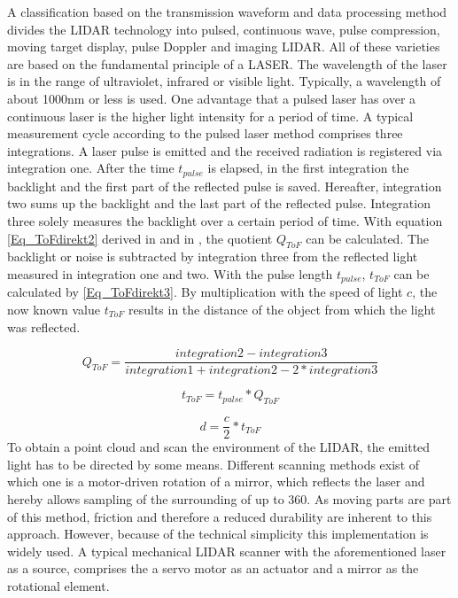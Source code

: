    A classification based on the transmission waveform and data processing method divides the \ac{LIDAR} technology into pulsed, continuous wave, pulse compression, moving target display, pulse Doppler and imaging \ac{LIDAR}. All of these varieties are based on the fundamental principle of a \ac{LASER}. The wavelength of the laser is in the range of ultraviolet, infrared or visible light. Typically, a wavelength of about 1000nm or less is used. One advantage that a pulsed laser has over a continuous laser is the higher light intensity for a period of time. A typical measurement cycle according to the pulsed laser method comprises three integrations. A laser pulse is emitted and the received radiation is registered via integration one. After the time $t_{pulse}$ is elapsed, in the first integration the backlight and the first part of the reflected pulse is saved. Hereafter, integration two sums up the backlight and the last part of the reflected pulse. Integration three solely measures the backlight over a certain period of time. With equation \ref{Eq_ToFdirekt2} derived in \cite{ASpieck} and in \cite{ADrie}, the quotient $Q_{ToF}$ can be calculated. The backlight or noise is subtracted by integration three from the reflected light measured in integration one and two. With the pulse length $t_{pulse}$, $t_{ToF}$ can be calculated by \eqref{Eq_ToFdirekt3}. By multiplication with the speed of light $c$, the now known value  $t_{ToF}$ results in the distance of the object from which the light was reflected.
      
    \begin{equation} 
   \label{Eq_ToFdirekt2}
   Q_{ToF}=\frac{integration2-integration3}{integration1+integration2-2*integration3}
   \end{equation}
   
   \begin{equation}
   \label{Eq_ToFdirekt3}
   t_{ToF}=t_{pulse}*Q_{ToF}
   \end{equation}
   
   \begin{equation} 
   \label{Eq_ToFdirekt1}
   d=\frac{c}{2}*t_{ToF}
   \end{equation}                                                                                                                               
   To obtain a point cloud and scan the environment of the \ac{LIDAR}, the emitted light has to be directed by some means. Different scanning methods exist of which one is a motor-driven rotation of a mirror, which reflects the laser and hereby allows sampling of the surrounding of up to 360\degree. As moving parts are part of this method, friction and therefore a reduced durability are inherent to this approach. However, because of the technical simplicity this implementation is widely used. A typical mechanical \ac{LIDAR} scanner with the aforementioned laser as a source, comprises the a servo motor as an actuator and a mirror as the rotational element.
  
